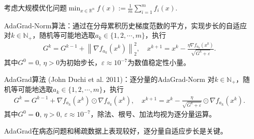 \documentclass[9pt,aspectratio=169]{beamer}
\begin{document}
\begin{frame}
考虑大规模优化问题$\min_{x\in \mathbb{R}^{n}} f(x):=\frac{1}{m}\sum_{i=1}^{m}f_i(x)$.
\begin{block}{AdaGrad-Norm算法：通过在分母累积历史梯度范数的平方，实现步长的自适应}
	对$k\in \mathbb{N}_+$，随机等可能地选取$a_k\in \{1,2,\cdots,m\}$，执行
	\begin{equation}\label{adagradnormdiedaigeshi}
		\begin{aligned}
		 G^{k}=G^{k-1}+\left\|\nabla f_{a_k }(x^k) \right\| _2^2,\quad
		 x^{k+1}=x^k-\frac{\eta \nabla f_{a_k}(x^k) }{\sqrt{G^k+\varepsilon}}.
		\end{aligned}
	 \end{equation}
	 其中$G^0=0,\,\eta>0$为初始步长，$\varepsilon\approx 10^{-7}$为数值稳定性小量。
\end{block}
% 
\begin{block}{AdaGrad算法 (John Duchi et al. 2011)：逐分量的AdaGrad-Norm}
		对$k\in \mathbb{N}_+$，随机等可能地选取$a_k\in \{1,2,\cdots,m\}$，执行
		\begin{equation}\label{adagraddiedaigeshi}
			\begin{aligned}
			 G^{k}=G^{k-1}+\nabla f_{a_k }(x^k)\odot \nabla f_{a_k }(x^k) ,\quad
			 x^{k+1}=x^k-\frac{\eta  }{\sqrt{G^k+\varepsilon}}\odot \nabla f_{a_k}(x^k).
			\end{aligned}
		 \end{equation}
		 其中$G^0=\mathbf{0},\,\eta>0,\,\varepsilon\approx 10^{-7}$，除法、根号、加法均视为逐分量运算。
\end{block}
\vspace{0.3cm}
AdaGrad在病态问题和稀疏数据上表现较好，逐分量自适应步长是关键。
\end{frame}
\end{document}
